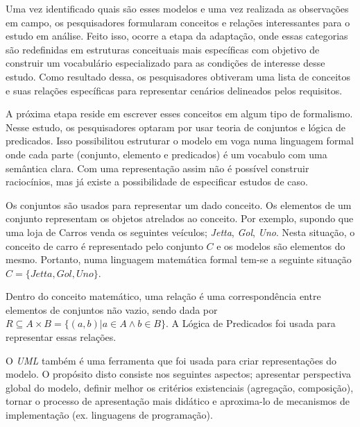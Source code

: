 Uma vez identificado quais são esses modelos e uma vez realizada as observações em campo, os pesquisadores formularam conceitos e relações interessantes para o estudo em análise. Feito isso, ocorre a etapa da adaptação, onde essas categorias são redefinidas em estruturas conceituais mais específicas com objetivo de construir um vocabulário especializado para as condições de interesse desse estudo. Como resultado dessa, os pesquisadores obtiveram uma lista de conceitos e suas relações específicas para representar cenários delineados pelos requisitos. 

A próxima etapa reside em escrever esses conceitos em algum tipo de formalismo. Nesse estudo, os pesquisadores optaram por usar teoria de conjuntos e lógica de predicados. Isso possibilitou estruturar o modelo em voga numa linguagem formal onde cada parte (conjunto, elemento e predicados) é um vocabulo com uma semântica clara. Com uma representação assim não é possível construir raciocínios, mas já existe a possibilidade de especificar estudos de caso. 

Os conjuntos são usados para representar um dado conceito. Os elementos de um conjunto representam os objetos atrelados ao 
conceito. Por exemplo, supondo que uma loja de Carros venda os seguintes veículos; \textit{Jetta}, \textit{Gol}, \textit{Uno}.
Nesta situação, o conceito de carro é representado pelo conjunto $C$ e os modelos são elementos do mesmo. Portanto, numa linguagem
matemática formal tem-se a seguinte situação $C = \{Jetta,Gol,Uno\}$. 

Dentro do conceito matemático, uma relação é uma correspondência entre elementos de conjuntos não vazio, sendo dada por
$R \subseteq  A \times B = \{(a,b)| a \in A \wedge b \in B \}$. A Lógica de Predicados foi usada para representar essas
relações.

O \textit{UML} também é uma ferramenta que foi usada para criar representações do modelo. O propósito disto consiste nos
seguintes aspectos; apresentar perspectiva global do modelo, definir melhor os critérios existenciais (agregação, composição),
tornar o processo de apresentação mais didático e aproxima-lo de mecanismos de implementação (ex. linguagens de programação). 